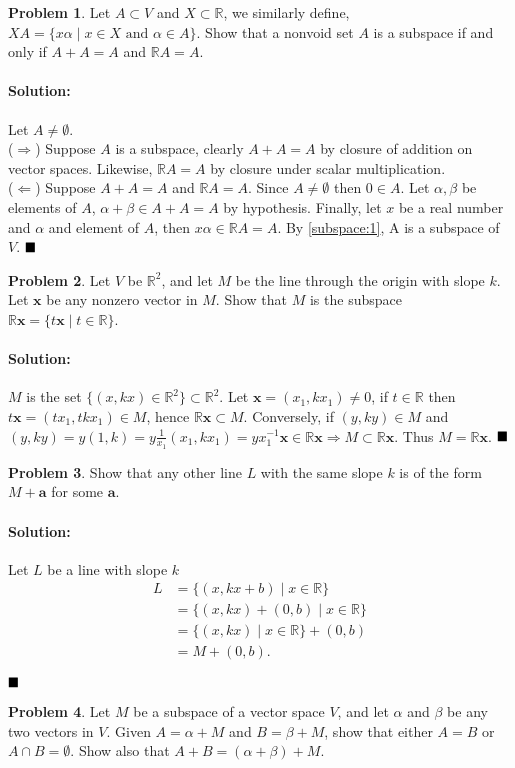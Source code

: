 \documentclass[]{article}
\newcommand{\RR}{\mathbb{R}}
\theoremstyle{definition}
\newtheorem{problem}{Problem}
\newenvironment{solution}{\paragraph{Solution:}}{\hfill$\blacksquare \\$}
\begin{document}
\begin{problem}
Let $A \subset V$ and $X \subset \RR$, we similarly define, $XA = \{x\alpha \mid x \in X \text{ and } \alpha \in A\}$. 
Show that a nonvoid set $A$ is a subspace if and only if $A+A = A$ and $\RR A = A$.	
\end{problem}
\begin{solution}
	Let $A \neq \emptyset$. \\
($\Rightarrow$) Suppose $A$ is a subspace, clearly $A+A = A$ by closure of addition on vector spaces. Likewise, $\RR A = A$ by closure under scalar multiplication. \\
($ \Leftarrow $) Suppose $A+A=A$ and $\RR A = A$. Since $A \neq \emptyset$ then $0 \in A$. Let $\alpha, \beta$ be elements of $A$, $\alpha + \beta \in A+A = A$ by hypothesis. Finally, let $x$ be a real number and $\alpha$ and element of $A$, then $x\alpha \in \RR A = A$. By \ref{subspace:1}, A is a subspace of $V$.
\end{solution}
\begin{problem}
Let $V$ be $\RR^2$, and let $M$ be the line through the origin with slope $k$. Let $\mathbf{x}$ be any nonzero vector in $M$. Show that $M$ is the subspace $\RR\mathbf{x} = \{t\mathbf{x} \mid t \in \RR\}$.	
\end{problem}
\begin{solution}
$M$ is the set $\{(x, kx) \in \RR^2\} \subset \RR^2$. Let $\mathbf{x} = (x_1, kx_1) \neq 0$, if $t \in \RR$ then $t\mathbf{x} = (tx_1, tkx_1) \in M$, hence $\RR\mathbf{x} \subset M$.
Conversely, if $(y, ky) \in M$ and $(y, ky) = y(1, k) = y\frac{1}{x_1}(x_1, kx_1) = yx_1^{-1}\mathbf{x} \in \RR\mathbf{x} \Rightarrow M \subset \RR\mathbf{x}$. Thus $M = \RR\mathbf{x}$.
\end{solution}
\begin{problem}
Show that any other line $L$ with the same slope $k$ is of the form $M + \mathbf{a}$ for some $\mathbf{a}$.
\end{problem}
\begin{solution}
Let $L$ be a line with slope $k$
\begin{align*}
	L &= \{(x, kx+b) \mid x \in \RR \} \\
	  &= \{(x,kx) + (0,b) \mid x \in \RR \} \\
	  &= \{(x, kx) \mid x \in \RR\} + (0,b) \\
	  &= M + (0,b).
\end{align*}	

\end{solution}
\begin{problem}
	Let $M$ be a subspace of a vector space $V$, and let $\alpha$ and $\beta$ be any two vectors in $V$.
	Given $A = \alpha + M$ and $B = \beta + M$, show that either $A = B$ or $A \cap B = \emptyset$.
	Show also that $A+B=(\alpha + \beta)  + M$.	
\end{problem}
\end{document}
